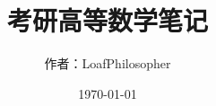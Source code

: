 \title{{\Huge{\textbf{考研高等数学笔记}}}}
\author{作者：LoafPhilosopher }
\date{\today}
\maketitle                   %
\thispagestyle{empty}        %

\newpage                      %
\pagestyle{plain}             %
\setcounter{page}{1}          %

\begin{spacing}{1.5}
	\tableofcontents
\end{spacing}           %
\newpage                      %
\pagestyle{plain}
\setcounter{page}{1}          %
